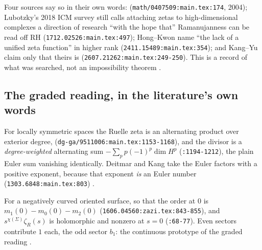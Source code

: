 \begin{citedfact}
\label{cit:no-general-complex-zeta}
\sloppy
Four sources say so in their own words:
{\small\texttt{}}
(\texttt{math/0407509:main.tex:174}, 2004); Lubotzky's 2018 ICM survey still
calls attaching zetas to high-dimensional complexes a direction of research
``with the hope that'' Ramanujanness can be read off RH
(\texttt{1712.02526:main.tex:497}); Hong--Kwon name ``the lack of a unified zeta
function'' in higher rank (\texttt{2411.15489:main.tex:354}); and Kang--Yu claim
only that theirs is
{\small\texttt{}}
(\texttt{2607.21262:main.tex:249-250}). This is a record of what was searched,
not an impossibility theorem
\cite{deitmarhoffman2006ihara,lubotzky2018hde,hongkwon2024edge}.
\end{citedfact}

\subsection{The graded reading, in the literature's own words}
\begin{citedfact}
\label{cit:deitmar-alternating}
\sloppy
For locally symmetric spaces the Ruelle zeta is an alternating product over
exterior degree,
{\small\texttt{}}
(\texttt{dg-ga/9511006:main.tex:1153-1168}), and the divisor is a
\emph{degree-weighted} alternating sum $-\sum_pp(-1)^p\dim H^p$
(\texttt{:1194-1212}), the plain Euler sum vanishing identically. Deitmar and
Kang take the Euler factors with a positive exponent, because that exponent
\emph{is} an Euler number (\texttt{1303.6848:main.tex:803})
\cite{deitmar1996geometric,deitmarkang2014geometric}.
\end{citedfact}

\begin{citedfact}
\label{cit:dz-order-chi}
\sloppy
For a negatively curved oriented surface,
{\small\texttt{}}
so that the order at $0$ is $m_1(0)-m_0(0)-m_2(0)$
(\texttt{1606.04560:zazi.tex:843-855}), and $s^{\chi(\Sigma)}\zeta_R(s)$ is %
holomorphic and nonzero at $s=0$ (\texttt{:68-77}). Even sectors contribute $1$
each, the odd sector $b_1$: the continuous prototype of the graded reading
\cite{dyatlov2017ruelle}.
\end{citedfact}

